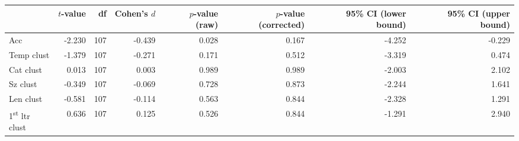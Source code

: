 \begin{tabular}{lrrrrrrr}
\toprule
{} & $t$-value &  df & Cohen's $d$ & $p$-value (raw) & $p$-value (corrected) & 95\% CI (lower bound) & 95\% CI (upper bound) \\
\midrule
Acc                             &    -2.230 & 107 &      -0.439 &           0.028 &                 0.167 &                -4.252 &                -0.229 \\
Temp clust                      &    -1.379 & 107 &      -0.271 &           0.171 &                 0.512 &                -3.319 &                 0.474 \\
Cat clust                       &     0.013 & 107 &       0.003 &           0.989 &                 0.989 &                -2.003 &                 2.102 \\
Sz clust                        &    -0.349 & 107 &      -0.069 &           0.728 &                 0.873 &                -2.244 &                 1.641 \\
Len clust                       &    -0.581 & 107 &      -0.114 &           0.563 &                 0.844 &                -2.328 &                 1.291 \\
1\textsuperscript{st} ltr clust &     0.636 & 107 &       0.125 &           0.526 &                 0.844 &                -1.291 &                 2.940 \\
\bottomrule
\end{tabular}
